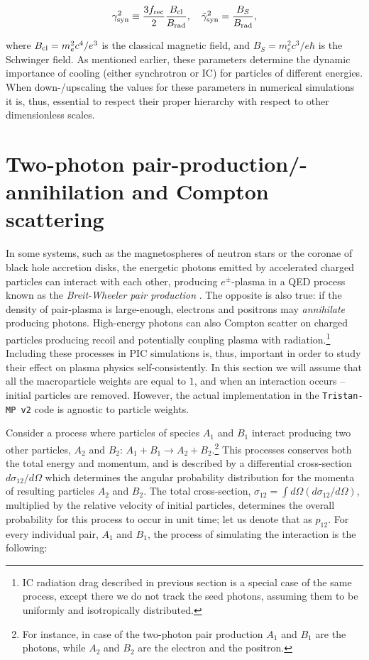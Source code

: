 \begin{equation}
    \gamma_{\rm syn}^2\equiv \frac{3 f_{\rm rec}}{2}\frac{B_{\rm cl}}{B_{\rm rad}},~~~\tilde{\gamma}_{\rm syn}^2 = \frac{B_S}{B_{\rm rad}},
\end{equation}

\noindent where $B_{\rm cl} = m_e^2 c^4 / e^3$ is the classical magnetic field, and $B_S = m_e^2 c^3 / e \hbar$ is the Schwinger field. As mentioned earlier, these parameters determine the dynamic importance of cooling (either synchrotron or IC) for particles of different energies. When down-/upscaling the values for these parameters in numerical simulations it is, thus, essential to respect their proper hierarchy with respect to other dimensionless scales.

\section{Two-photon pair-production/-annihilation and Compton scattering}
\label{sec:num-QED}

In some systems, such as the magnetospheres of neutron stars or the coronae of black hole accretion disks, the energetic photons emitted by accelerated charged particles can interact with each other, producing $e^\pm$-plasma in a QED process known as the \emph{Breit-Wheeler pair production} \citep[see, e.g.,][]{1987MNRAS.227..403S, 1996A&A...311..172L, 2017ApJ...850..141B, 2020arXiv201107310B}. The opposite is also true: if the density of pair-plasma is large-enough, electrons and positrons may \emph{annihilate} producing photons. High-energy photons can also Compton scatter on charged particles producing recoil and potentially coupling plasma with radiation.\footnote{IC radiation drag described in previous section is a special case of the same process, except there we do not track the seed photons, assuming them to be uniformly and isotropically distributed.} Including these processes in PIC simulations is, thus, important in order to study their effect on plasma physics self-consistently. In this section we will assume that all the macroparticle weights are equal to $1$, and when an interaction occurs -- initial particles are removed. However, the actual implementation in the \texttt{Tristan-MP v2} code is agnostic to particle weights. 

Consider a process where particles of species $A_1$ and $B_1$ interact producing two other particles, $A_2$ and $B_2$: $A_1+B_1\to A_2+B_2$.\footnote{For instance, in case of the two-photon pair production $A_1$ and $B_1$ are the photons, while $A_2$ and $B_2$ are the electron and the positron.} This processes conserves both the total energy and momentum, and is described by a differential cross-section $d\sigma_{12} / d\Omega$ which determines the angular probability distribution for the momenta of resulting particles $A_2$ and $B_2$. The total cross-section, $\sigma_{12}=\int d\Omega \left(d\sigma_{12} / d\Omega\right)$, multiplied by the relative velocity of initial particles, determines the overall probability for this process to occur in unit time; let us denote that as $p_{12}$. For every individual pair, $A_1$ and $B_1$, the process of simulating the interaction is the following:

